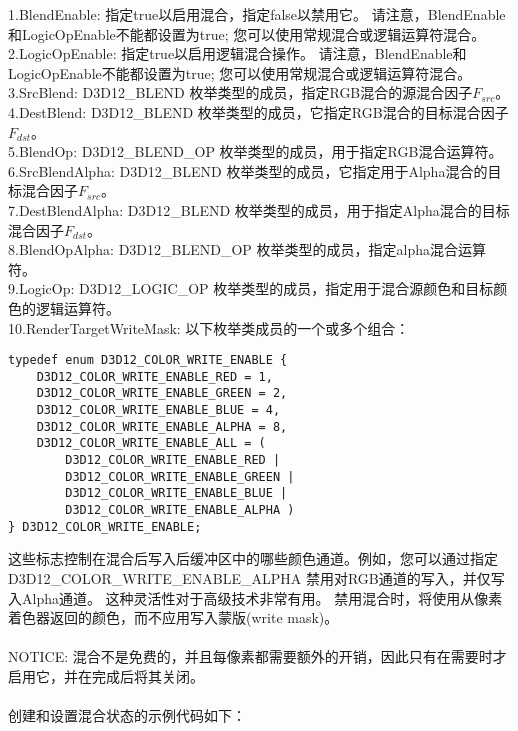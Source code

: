 \begin{flushleft}
1.BlendEnable: 指定true以启用混合，指定false以禁用它。 请注意，BlendEnable和LogicOpEnable不能都设置为true; 您可以使用常规混合或逻辑运算符混合。\\

2.LogicOpEnable: 指定true以启用逻辑混合操作。 请注意，BlendEnable和LogicOpEnable不能都设置为true; 您可以使用常规混合或逻辑运算符混合。\\

3.SrcBlend: D3D12\_BLEND 枚举类型的成员，指定RGB混合的源混合因子$F_{src}$。\\

4.DestBlend: D3D12\_BLEND 枚举类型的成员，它指定RGB混合的目标混合因子$F_{dst}$。\\

5.BlendOp: D3D12\_BLEND\_OP 枚举类型的成员，用于指定RGB混合运算符。\\

6.SrcBlendAlpha: D3D12\_BLEND 枚举类型的成员，它指定用于Alpha混合的目标混合因子$F_{src}$。\\

7.DestBlendAlpha: D3D12\_BLEND 枚举类型的成员，用于指定Alpha混合的目标混合因子$F_{dst}$。\\

8.BlendOpAlpha: D3D12\_BLEND\_OP 枚举类型的成员，指定alpha混合运算符。\\

9.LogicOp: D3D12\_LOGIC\_OP 枚举类型的成员，指定用于混合源颜色和目标颜色的逻辑运算符。\\

10.RenderTargetWriteMask: 以下枚举类成员的一个或多个组合：\\
\end{flushleft}

\begin{lstlisting}
typedef enum D3D12_COLOR_WRITE_ENABLE {
    D3D12_COLOR_WRITE_ENABLE_RED = 1,
    D3D12_COLOR_WRITE_ENABLE_GREEN = 2,
    D3D12_COLOR_WRITE_ENABLE_BLUE = 4,
    D3D12_COLOR_WRITE_ENABLE_ALPHA = 8,
    D3D12_COLOR_WRITE_ENABLE_ALL = ( 
        D3D12_COLOR_WRITE_ENABLE_RED |
        D3D12_COLOR_WRITE_ENABLE_GREEN |
        D3D12_COLOR_WRITE_ENABLE_BLUE |
        D3D12_COLOR_WRITE_ENABLE_ALPHA )
} D3D12_COLOR_WRITE_ENABLE;
\end{lstlisting}

\begin{flushleft}
这些标志控制在混合后写入后缓冲区中的哪些颜色通道。例如，您可以通过指定 D3D12\_COLOR\_WRITE\_ENABLE\_ALPHA 禁用对RGB通道的写入，并仅写入Alpha通道。 这种灵活性对于高级技术非常有用。 禁用混合时，将使用从像素着色器返回的颜色，而不应用写入蒙版(write mask)。\\
~\\
NOTICE: 混合不是免费的，并且每像素都需要额外的开销，因此只有在需要时才启用它，并在完成后将其关闭。\\
~\\
创建和设置混合状态的示例代码如下：\\
\end{flushleft}

